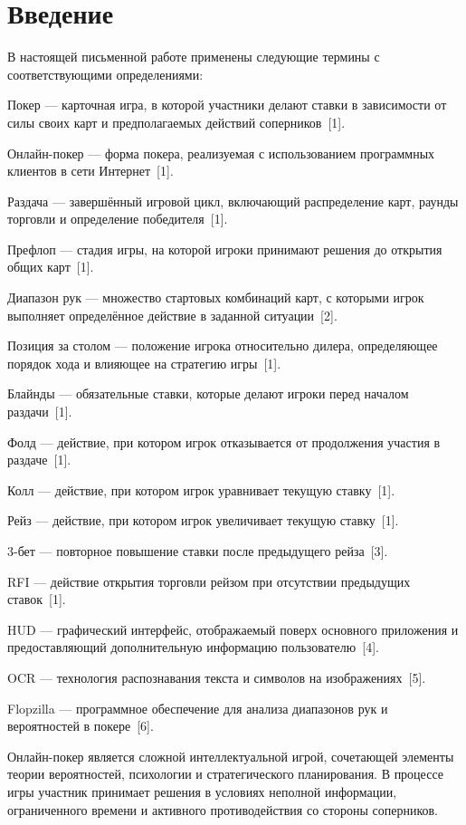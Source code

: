 \section*{Введение}

В настоящей письменной работе применены следующие термины с соответствующими определениями:

Покер --- карточная игра, в которой участники делают ставки в зависимости от силы своих карт и предполагаемых действий соперников~[1].

Онлайн-покер --- форма покера, реализуемая с использованием программных клиентов в сети Интернет~[1].

Раздача --- завершённый игровой цикл, включающий распределение карт, раунды торговли и определение победителя~[1].

Префлоп --- стадия игры, на которой игроки принимают решения до открытия общих карт~[1].

Диапазон рук --- множество стартовых комбинаций карт, с которыми игрок выполняет определённое действие в заданной ситуации~[2].

Позиция за столом --- положение игрока относительно дилера, определяющее порядок хода и влияющее на стратегию игры~[1].

Блайнды --- обязательные ставки, которые делают игроки перед началом раздачи~[1].

Фолд --- действие, при котором игрок отказывается от продолжения участия в раздаче~[1].

Колл --- действие, при котором игрок уравнивает текущую ставку~[1].

Рейз --- действие, при котором игрок увеличивает текущую ставку~[1].

3-бет --- повторное повышение ставки после предыдущего рейза~[3].

RFI --- действие открытия торговли рейзом при отсутствии предыдущих ставок~[1].

HUD --- графический интерфейс, отображаемый поверх основного приложения и предоставляющий дополнительную информацию пользователю~[4].

OCR --- технология распознавания текста и символов на изображениях~[5].

Flopzilla --- программное обеспечение для анализа диапазонов рук и вероятностей в покере~[6].

Онлайн-покер является сложной интеллектуальной игрой, сочетающей элементы теории вероятностей, психологии и стратегического планирования. В процессе игры участник принимает решения в условиях неполной информации, ограниченного времени и активного противодействия со стороны соперников.

